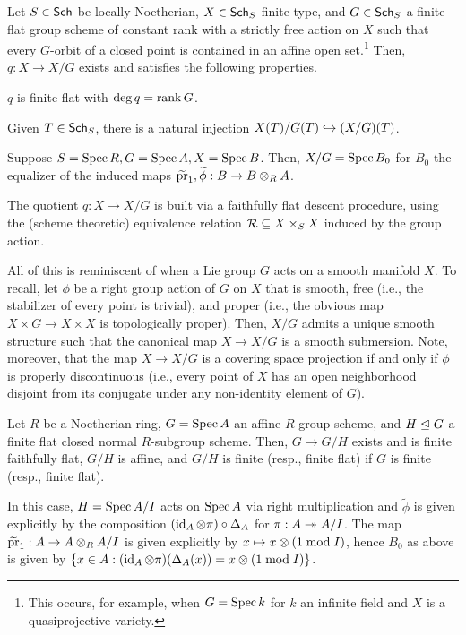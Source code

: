 \documentclass[11pt]{article}
\begin{document}
\begin{theorem}[Grothendieck]
Let $S\in\operatorname{\mathsf{Sch}}$ be locally Noetherian, $X\in\operatorname{\mathsf{Sch}}_S$ finite type, and $G\in\operatorname{\mathsf{Sch}}_S$ a finite flat group scheme of constant rank with a strictly free action on $X$ such that every $G$-orbit of a closed point is contained in an affine open set.\footnote{This occurs, for example, when $G=\operatorname{Spec} k$ for $k$ an infinite field and $X$ is a quasiprojective variety.} Then, $q: X\to X/G$ exists and satisfies the following properties.
\begin{enum}{\alph}
\item $q$ is finite flat with $\deg q=\operatorname{rank} G$.
\item Given $T\in\operatorname{\mathsf{Sch}}_S$, there is a natural injection $X(T)/G(T)\hookrightarrow(X/G)(T)$.
\item Suppose $S=\operatorname{Spec} R,G=\operatorname{Spec} A,X=\operatorname{Spec} B$. Then, $X/G=\operatorname{Spec} B_0$ for $B_0$ the equalizer of the induced maps $\widetilde{\operatorname{pr}}_1,\widetilde{\phi}: B\to B\otimes_RA$.
\end{enum}
\end{theorem}

The quotient $q: X\to X/G$ is built via a faithfully flat descent procedure, using the (scheme theoretic) equivalence relation $\mathcal{R}\subseteq X\times_SX$ induced by the group action.

\begin{remark}
All of this is reminiscent of when a Lie group $G$ acts on a smooth manifold $X$. To recall, let $\phi$ be a right group action of $G$ on $X$ that is smooth, free (i.e., the stabilizer of every point is trivial), and proper (i.e., the obvious map $X\times G\to X\times X$ is topologically proper). Then, $X/G$ admits a unique smooth structure such that the canonical map $X\to X/G$ is a smooth submersion. Note, moreover, that the map $X\to X/G$ is a covering space projection if and only if $\phi$ is properly discontinuous (i.e., every point of $X$ has an open neighborhood disjoint from its conjugate under any non-identity element of $G$).
\end{remark}

\begin{corollary}
Let $R$ be a Noetherian ring, $G=\operatorname{Spec} A$ an affine $R$-group scheme, and $H\trianglelefteq G$ a finite flat closed normal $R$-subgroup scheme. Then, $G\to G/H$ exists and is finite faithfully flat, $G/H$ is affine, and $G/H$ is finite (resp., finite flat) if $G$ is finite (resp., finite flat).
\end{corollary}

In this case, $H=\operatorname{Spec} A/I$ acts on $\operatorname{Spec} A$ via right multiplication and $\widetilde{\phi}$ is given explicitly by the composition $(\operatorname{id}_A\otimes\pi)\circ\Delta_A$ for $\pi: A\twoheadrightarrow A/I$. The map $\widetilde{\operatorname{pr}}_1: A\to A\otimes_RA/I$ is given explicitly by $x\mapsto x\otimes(1\bmod{I})$, hence $B_0$ as above is given by $\{x\in A : (\operatorname{id}_A\otimes\pi)(\Delta_A(x))=x\otimes(1\bmod{I})\}$.
\end{document}
